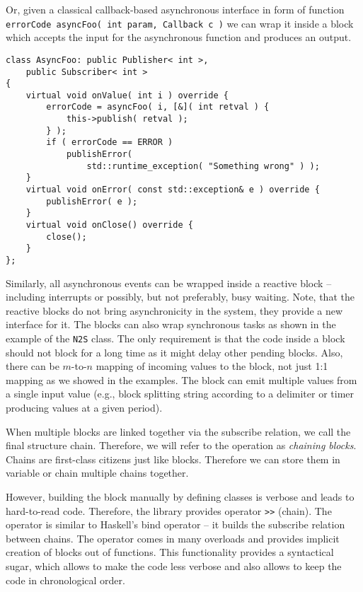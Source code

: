 Or, given a classical callback-based asynchronous interface in form of function
\texttt{errorCode asyncFoo( int param, Callback c )} we can
wrap it inside a block which accepts the input for the asynchronous function and
produces an output.
\begin{verbatim}
class AsyncFoo: public Publisher< int >,
    public Subscriber< int >
{
    virtual void onValue( int i ) override {
        errorCode = asyncFoo( i, [&]( int retval ) {
            this->publish( retval );
        } );
        if ( errorCode == ERROR )
            publishError(
                std::runtime_exception( "Something wrong" ) );
    }
    virtual void onError( const std::exception& e ) override {
        publishError( e );
    }
    virtual void onClose() override {
        close();
    }
};
\end{verbatim}

Similarly, all asynchronous events can be wrapped inside a reactive block --
including interrupts or possibly, but not preferably, busy waiting. Note, that
the reactive blocks do not bring asynchronicity in the system, they provide
a new interface for it. The blocks can also wrap synchronous tasks as shown in
the example of the \texttt{N2S} class. The only requirement is that the code
inside a block should not block for a long time as it might delay other pending
blocks. Also, there can be $m$-to-$n$ mapping of incoming values to the block,
not just 1:1 mapping as we showed in the examples. The block can emit multiple
values from a single input value (e.g., block splitting string according to a
delimiter or timer producing values at a given period).

When multiple blocks are linked together via the subscribe relation, we call the
final structure chain. Therefore, we will refer to the operation as
\emph{chaining blocks}. Chains are first-class citizens just like blocks.
Therefore we can store them in variable or chain multiple chains together.

However, building the block manually by defining classes is verbose and leads to
hard-to-read code. Therefore, the library provides operator
\texttt{>>} (chain). The operator is similar to Haskell's
bind operator -- it builds the subscribe relation between chains. The operator
comes in many overloads and provides implicit creation of blocks out of
functions. This functionality provides a syntactical sugar, which allows to make
the code less verbose and also allows to keep the code in chronological order.

